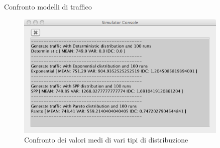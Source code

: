 \documentclass[slidestop,compress,mathserif]{beamer}
\begin{document}
\begin{frame}{Confronto modelli di traffico}
\begin{figure}[!h]{
	\begin{center}
	   \includegraphics[width=0.9\textwidth]{figures/simconsole.png}
	\end{center}}
	\caption{Confronto dei valori medi di vari tipi di distribuzione}
	\label{fig:random}
\end{figure}
\end{frame}
\end{document}
